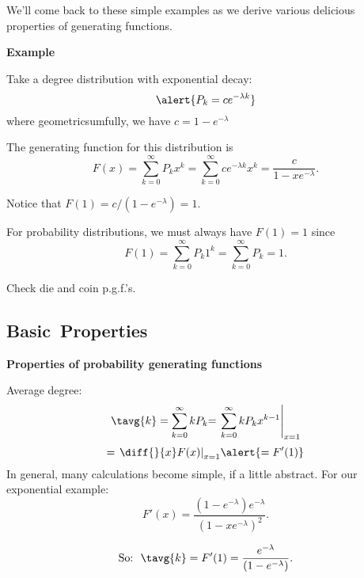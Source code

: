 \begin{frame}[label=]
\begin{frame}[label=]
      We'll come back to these simple examples
      as we derive various delicious properties 
      of generating functions.
    
  


\begin{frame}[label=]
  \textbf{Example}

    
    
      Take a degree distribution with exponential decay:
      $$ \alert{P_k = c e^{-\lambda k}} $$
      where geometricsumfully, we have $c = 1 - e^{-\lambda}$
    
      The generating function for this distribution is
      $$ 
      F(x)
      =
      \sum_{k=0}^\infty
      P_k x^k
      {
      =
      \sum_{k=0}^\infty
      c e^{-\lambda k} x^k
      }
      {
      =
      \frac{c}{1-xe^{-\lambda}}.
      }
      $$
    
      Notice that $F(1) = c/(1-e^{-\lambda}) = 1$.
    
      For probability distributions, we must
      always have \alert{$F(1)=1$} since
      $$
      F(1) 
      = 
      \sum_{k=0}^\infty P_k 1^k 
      {
        =
        \sum_{k=0}^\infty P_k
      }
      {
        =
        1.
      }
      $$
    
      Check die and coin p.g.f.'s.
    
  

\subsection{Basic\ Properties}

\begin{frame}[label=]
  \textbf{Properties of probability generating functions}

  \small

  
  
    Average degree:
    $$
    \tavg{k} 
    = 
    \sum_{k=0}^\infty k P_k
    {
      =
      \left. 
        \sum_{k=0}^\infty k P_k x^{k-1} 
      \right|_{x=1}
    }
    $$
    $$
    {
      =
      \left. 
        \diff{}{x} F(x)
      \right|_{x=1}
    }
    {
      \alert{
        =
        F'(1)
      }
    }
    $$
   In general, many calculations become simple, if a little abstract.
   For our exponential example:
    $$
    F'(x) = 
    \frac{(1-e^{-\lambda}) e^{-\lambda}}
    {(1-xe^{-\lambda})^2}.
    $$
  
    $$
    \mbox{So:} \ \
    \tavg{k} = F'(1) =     
    \frac{e^{-\lambda}}
    {(1-e^{-\lambda})}.
    $$
    

\end{frame}
\end{frame}
\end{frame}
\end{frame}

